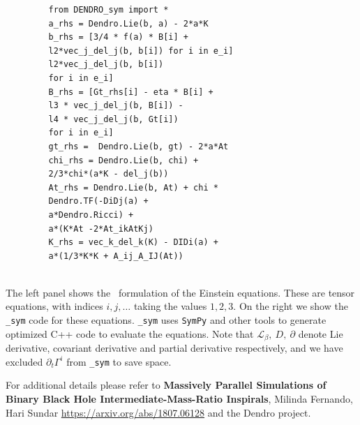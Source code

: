 \documentclass[landscape]{a0poster}
\def\Subhead#1{\noindent{\textbf{\Large\color{DarkBlue} #1}}\medskip}
\begin{document}
\begin{textblock}{14}
\begin{figure}
\begin{minipage}[t]{.5\textwidth}
\begin{verbatim}
   from DENDRO_sym import *
   a_rhs = Dendro.Lie(b, a) - 2*a*K
   b_rhs = [3/4 * f(a) * B[i] + 
   l2*vec_j_del_j(b, b[i]) for i in e_i]
   l2*vec_j_del_j(b, b[i]) 
   for i in e_i]
   B_rhs = [Gt_rhs[i] - eta * B[i] + 
   l3 * vec_j_del_j(b, B[i]) - 
   l4 * vec_j_del_j(b, Gt[i]) 
   for i in e_i]
   gt_rhs =  Dendro.Lie(b, gt) - 2*a*At
   chi_rhs = Dendro.Lie(b, chi) + 
   2/3*chi*(a*K - del_j(b)) 
   At_rhs = Dendro.Lie(b, At) + chi *
   Dendro.TF(-DiDj(a) + 
   a*Dendro.Ricci) +
   a*(K*At -2*At_ikAtKj)
   K_rhs = vec_k_del_k(K) - DIDi(a) +
   a*(1/3*K*K + A_ij_A_IJ(At)) 
   
\end{verbatim}
\end{minipage}
\vspace{-0.15in}
\end{figure}
The left panel shows the \BSSN ~formulation of the Einstein equations. These are tensor equations, with indices $i,j,\ldots$ taking the values $1, 2, 3$. On the right we show the \texttt{{\dendro\_sym}} code for these equations. \texttt{\dendro\_sym} uses \texttt{SymPy} and other tools to generate optimized C++ code to evaluate the equations. Note that $\mathcal{L}_\beta,\ D,\ \partial$ denote Lie derivative, covariant derivative and partial derivative respectively, and we have excluded $\partial_t\Gamma^i$ from \texttt{\dendro\_sym} to save space.

For additional details please refer to {\bf Massively Parallel Simulations of Binary Black Hole Intermediate-Mass-Ratio Inspirals}, Milinda Fernando, Hari Sundar \url{https://arxiv.org/abs/1807.06128} and the Dendro project.



\end{textblock}





	
\end{document}
